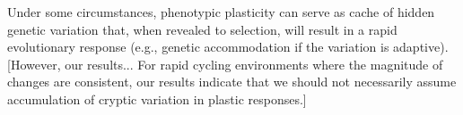 








Under some circumstances, phenotypic plasticity can serve as cache of hidden genetic variation that, when revealed to selection, will result in a rapid evolutionary response (e.g., genetic accommodation if the variation is adaptive).
[However, our results... For rapid cycling environments where the magnitude of changes are consistent, our results indicate that we should not necessarily assume accumulation of cryptic variation in plastic responses.]


